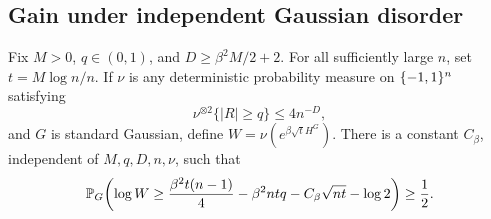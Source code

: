 \subsection{Gain under independent Gaussian disorder}

\begin{lemma}
\label{poly-lem:coverage-gain}
Fix $M>0$, $q\in(0,1)$, and $D\ge\beta^2M/2+2$.
For all sufficiently large $n$, set $t=M\log n/n$.
If $\nu$ is any deterministic probability measure on $\{-1,1\}^n$ satisfying
\[
 \nu^{\otimes2}\{|R|\ge q\}\le4n^{-D},
\]
and $G$ is standard Gaussian, define
$W=\nu(e^{\beta\sqrt t H^G})$.
There is a constant $C_\beta$, independent of $M,q,D,n,\nu$, such that
\begin{equation}\label{poly-eq:coverage-gain}
 \mathbb P_G\!\left(
 \log W\ge\frac{\beta^2t(n-1)}4
       -\beta^2ntq-C_\beta\sqrt{nt}-\log2
 \right)\ge\frac12.
\end{equation}
\end{lemma}

